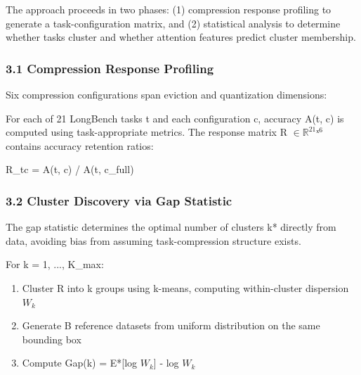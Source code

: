 
The approach proceeds in two phases: (1) compression response profiling to generate a task-configuration matrix, and (2) statistical analysis to determine whether tasks cluster and whether attention features predict cluster membership.

\subsubsection{3.1 Compression Response Profiling}

Six compression configurations span eviction and quantization dimensions:

\begin{table}[htbp]
\centering
{}
\end{table}

For each of 21 LongBench tasks t and each configuration c, accuracy A(t, c) is computed using task-appropriate metrics. The response matrix R $\in \mathbb{R}^{21}ˣ^6$ contains accuracy retention ratios:

R\_tc = A(t, c) / A(t, c\_full)

\subsubsection{3.2 Cluster Discovery via Gap Statistic}

The gap statistic determines the optimal number of clusters k* directly from data, avoiding bias from assuming task-compression structure exists.

For k = 1, ..., K\_max:
\begin{enumerate}
\item Cluster R into k groups using k-means, computing within-cluster dispersion $W_k$
\item Generate B reference datasets from uniform distribution on the same bounding box
\item Compute Gap(k) = E*[log $W_k$] - log $W_k$
\end{enumerate}

